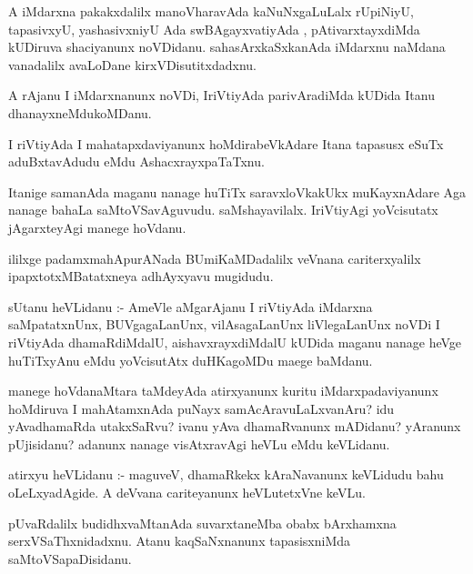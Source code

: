 \documentclass{article}
\begin{document}
\begin{mn}
A iMdarxna pakakxdalilx manoVharavAda  kaNuNxgaLuLalx rUpiNiyU, tapasivxyU, 
yashasivxniyU Ada swBAgayxvatiyAda , pAtivarxtayxdiMda kUDiruva shaciyanunx 
noVDidanu. sahasArxkaSxkanAda  iMdarxnu  naMdana vanadalilx avaLoDane kirxVDisutitxdadxnu.
\end{mn}

\begin{mn}
A rAjanu I iMdarxnanunx noVDi, IriVtiyAda parivAradiMda kUDida Itanu dhanayxneMdukoMDanu.
\end{mn}

\begin{mn}
I riVtiyAda I mahatapxdaviyanunx  hoMdirabeVkAdare Itana tapasusx eSuTx aduBxtavAdudu eMdu AshacxrayxpaTaTxnu.
\end{mn}

\begin{mn}
Itanige samanAda maganu  nanage huTiTx saravxloVkakUkx muKayxnAdare Aga nanage
 bahaLa saMtoVSavAguvudu.  saMshayavilalx. IriVtiyAgi yoVcisutatx  jAgarxteyAgi manege hoVdanu.
\end{mn}

\begin{mn}
ililxge padamxmahApurANada BUmiKaMDadalilx veVnana cariterxyalilx ipapxtotxMBatatxneya adhAyxyavu mugidudu.
\end{mn}




\begin{mn}
sUtanu heVLidanu :- AmeVle  aMgarAjanu I riVtiyAda iMdarxna saMpatatxnUnx, 
BUVgagaLanUnx, vilAsagaLanUnx liVlegaLanUnx noVDi I riVtiyAda  dhamaRdiMdalU, 
aishavxrayxdiMdalU kUDida maganu nanage heVge huTiTxyAnu eMdu  yoVcisutAtx duHKagoMDu maege baMdanu. 
\end{mn}

\begin{mn}
manege hoVdanaMtara taMdeyAda atirxyanunx kuritu iMdarxpadaviyanunx  hoMdiruva 
I mahAtamxnAda  puNayx samAcAravuLaLxvanAru? idu yAvadhamaRda utakxSaRvu?  
ivanu yAva dhamaRvanunx mADidanu? yAranunx pUjisidanu? adanunx nanage visAtxravAgi heVLu eMdu keVLidanu.
\end{mn}

\begin{mn}
atirxyu heVLidanu :- maguveV, dhamaRkekx kAraNavanunx keVLidudu bahu oLeLxyadAgide.  
A deVvana cariteyanunx  heVLutetxVne keVLu.
\end{mn}

\begin{mn}
pUvaRdalilx budidhxvaMtanAda suvarxtaneMba obabx bArxhamxna serxVSaThxnidadxnu. 
Atanu kaqSaNxnanunx tapasisxniMda saMtoVSapaDisidanu. 
\end{mn}
\end{document}
